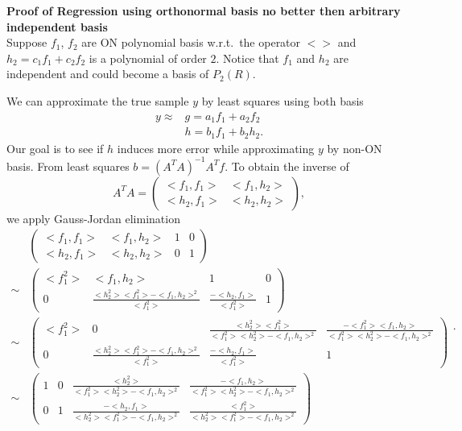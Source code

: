 
{\bf Proof of Regression using orthonormal basis no better then arbitrary independent basis} \\
Suppose $f_1$, $f_2$ are ON polynomial basis w.r.t.\ the operator $<>$ and $h_2 = c_1f_1 + c_2f_2$
is a polynomial of order $2$.
Notice that $f_1$ and $h_2$ are independent and could become a basis of $P_2(R)$.

We can approximate the true sample $y$ by least squares using both basis
\begin{equation}
  \begin{aligned}
     y \approx & g = a_1f_1 + a_2f_2 \\
               & h = b_1f_1 + b_2h_2. 
  \end{aligned}
\end{equation}
Our goal is to see if $h$ induces more error while approximating $y$ by non-ON basis.
From least squares $b = (A^TA)^{-1}A^Tf$.  
To obtain the inverse of 
\begin{equation}
  A^TA =
  \begin{pmatrix}
     <f_1,f_1> & <f_1,h_2> \\
     <h_2,f_1> & <h_2,h_2>
  \end{pmatrix},
\end{equation}
we apply Gauss-Jordan elimination
\begin{equation}
  \begin{aligned}
  &
  \begin{pmatrix}
    <f_1,f_1> & <f_1,h_2> & 1 & 0 \\
    <h_2,f_1> & <h_2,h_2> & 0 & 1
  \end{pmatrix} \\
  \sim
  &
  \begin{pmatrix}
    <f_1^2> & <f_1,h_2> & 1 & 0 \\
    0 & \frac{<h_2^2><f_1^2> - <f_1,h_2>^2}{<f_1^2>} & \frac{-<h_2,f_1>}{<f_1^2>} & 1 
  \end{pmatrix} \\
  \sim
  &
  \begin{pmatrix}
  <f_1^2> & 0 & \frac{<h_2^2><f_1^2>}{<f_1^2><h_2^2> - <f_1,h_2>^2} &
  \frac{-<f_1^2><f_1,h_2>}{<f_1^2><h_2^2> - <f_1,h_2>^2} \\
  0 & \frac{<h_2^2><f_1^2> - <f_1,h_2>^2}{<f_1^2>} & \frac{-<h_2,f_1>}{<f_1^2>} & 1 
  \end{pmatrix} \\
  \sim
  &
  \begin{pmatrix}
   1 & 0 & \frac{<h_2^2>}{<f_1^2><h_2^2> - <f_1,h_2>^2} & \frac{-<f_1,h_2>}{<f_1^2><h_2^2> -
   <f_1,h_2>^2} \\
   0 & 1 & \frac{-<h_2,f_1>}{<h_2^2><f_1^2> - <f_1,h_2>^2} & \frac{<f_1^2>}{<h_2^2><f_1^2> -
   <f_1,h_2>^2}
  \end{pmatrix}
  \end{aligned}.
\end{equation}

